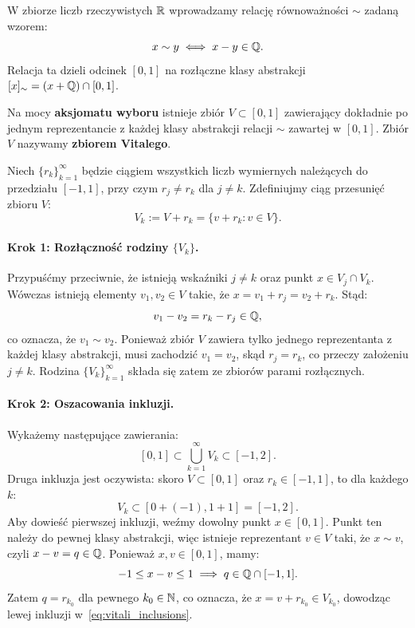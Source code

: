 \begin{dow}
    W zbiorze liczb rzeczywistych $\mathbb{R}$ wprowadzamy relację równoważności $\sim$ zadaną wzorem:
    \begin{equation*}
        x \sim y \iff x - y \in \mathbb{Q}.
    \end{equation*}
    Relacja ta dzieli odcinek $[0, 1]$ na rozłączne klasy abstrakcji $[x]_\sim = (x + \mathbb{Q}) \cap [0, 1]$.

    Na mocy \textbf{aksjomatu wyboru} istnieje zbiór $V \subset [0, 1]$ zawierający dokładnie po jednym reprezentancie z każdej klasy abstrakcji relacji $\sim$ zawartej w $[0, 1]$. Zbiór $V$ nazywamy \textbf{zbiorem Vitalego}.

    Niech $\{r_k\}_{k=1}^\infty$ będzie ciągiem wszystkich liczb wymiernych należących do przedziału $[-1, 1]$, przy czym $r_j \neq r_k$ dla $j \neq k$. Zdefiniujmy ciąg przesunięć zbioru $V$:
    \begin{equation*}
        V_k := V + r_k = \{v + r_k \colon v \in V\}.
    \end{equation*}

    \paragraph{Krok 1: Rozłączność rodziny $\{V_k\}$.}
    Przypuśćmy przeciwnie, że istnieją wskaźniki $j \neq k$ oraz punkt $x \in V_j \cap V_k$. Wówczas istnieją elementy $v_1, v_2 \in V$ takie, że $x = v_1 + r_j = v_2 + r_k$. Stąd:
    \begin{equation*}
        v_1 - v_2 = r_k - r_j \in \mathbb{Q},
    \end{equation*}
    co oznacza, że $v_1 \sim v_2$. Ponieważ zbiór $V$ zawiera tylko jednego reprezentanta z każdej klasy abstrakcji, musi zachodzić $v_1 = v_2$, skąd $r_j = r_k$, co przeczy założeniu $j \neq k$. Rodzina $\{V_k\}_{k=1}^\infty$ składa się zatem ze zbiorów parami rozłącznych.

    \paragraph{Krok 2: Oszacowania inkluzji.}
    Wykażemy następujące zawierania:
    \begin{equation}\label{eq:vitali_inclusions}
        [0, 1] \subset \bigcup_{k=1}^\infty V_k \subset [-1, 2].
    \end{equation}
    Druga inkluzja jest oczywista: skoro $V \subset [0, 1]$ oraz $r_k \in [-1, 1]$, to dla każdego $k$:
    \begin{equation*}
        V_k \subset [0 + (-1), 1 + 1] = [-1, 2].
    \end{equation*}
    Aby dowieść pierwszej inkluzji, weźmy dowolny punkt $x \in [0, 1]$. Punkt ten należy do pewnej klasy abstrakcji, więc istnieje reprezentant $v \in V$ taki, że $x \sim v$, czyli $x - v = q \in \mathbb{Q}$. Ponieważ $x, v \in [0, 1]$, mamy:
    \begin{equation*}
        -1 \le x - v \le 1 \implies q \in \mathbb{Q} \cap [-1, 1].
    \end{equation*}
    Zatem $q = r_{k_0}$ dla pewnego $k_0 \in \mathbb{N}$, co oznacza, że $x = v + r_{k_0} \in V_{k_0}$, dowodząc lewej inkluzji w~\eqref{eq:vitali_inclusions}.


\end{dow}
